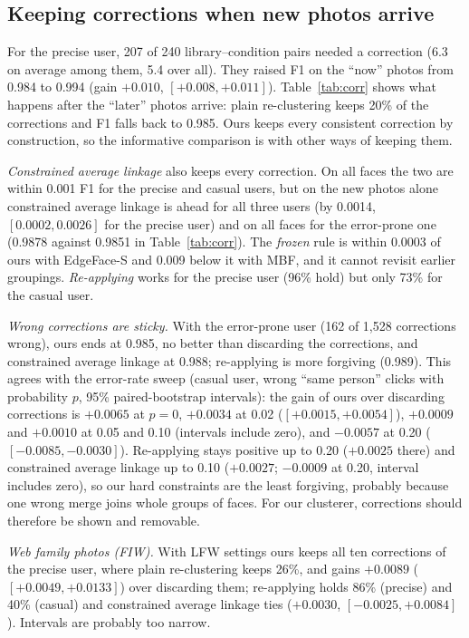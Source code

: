 \documentclass[conference]{IEEEtran}
\begin{document}
\subsection{Keeping corrections when new photos arrive}\label{sec:corr}
For the precise user, 207 of 240 library--condition pairs needed a correction (6.3 on average among them, 5.4 over all).
They raised F1 on the ``now'' photos from 0.984 to 0.994 (gain $+0.010$, $[+0.008,+0.011]$). Table~\ref{tab:corr} shows
what happens after the ``later'' photos arrive: plain re-clustering keeps 20\% of the corrections and F1 falls back to
0.985. Ours keeps every consistent correction by construction, so the informative comparison is with other ways of keeping them.

\emph{Constrained average linkage} also keeps every correction. On all faces the two are within 0.001 F1 for the precise and
casual users, but on the new photos alone constrained average linkage is ahead for all three users (by 0.0014, $[0.0002,0.0026]$ for
the precise user) and on all faces for the error-prone one (0.9878 against 0.9851 in Table~\ref{tab:corr}). The \emph{frozen} rule is
within 0.0003 of ours with EdgeFace-S and 0.009 below it with MBF, and it cannot revisit earlier groupings. \emph{Re-applying} works for the
precise user (96\% hold) but only 73\% for the casual user.

\emph{Wrong corrections are sticky.} With the error-prone user (162 of 1{,}528 corrections wrong), ours ends at 0.985, no
better than discarding the corrections, and constrained average linkage at 0.988; re-applying is more forgiving (0.989). This agrees with the error-rate sweep (casual user, wrong ``same person'' clicks with probability $p$, 95\% paired-bootstrap
intervals): the gain of ours over discarding corrections is $+0.0065$ at $p=0$, $+0.0034$ at 0.02 ($[+0.0015,+0.0054]$),
$+0.0009$ and $+0.0010$ at 0.05 and 0.10 (intervals include zero), and $-0.0057$ at 0.20 ($[-0.0085,-0.0030]$). Re-applying stays
positive up to 0.20 ($+0.0025$ there) and constrained average linkage up to 0.10 ($+0.0027$; $-0.0009$ at 0.20, interval
includes zero), so our hard constraints are the least forgiving, probably because one
wrong merge joins whole groups of faces. For our clusterer, corrections should therefore be shown and removable.

\emph{Web family photos (FIW).} With LFW settings ours keeps all ten corrections of the precise user, where plain re-clustering
keeps 26\%, and gains $+0.0089$ ($[+0.0049,+0.0133]$) over discarding them; re-applying holds 86\% (precise) and 40\% (casual) and constrained average linkage ties
($+0.0030$, $[-0.0025,+0.0084]$). Intervals are probably too narrow.
\end{document}
